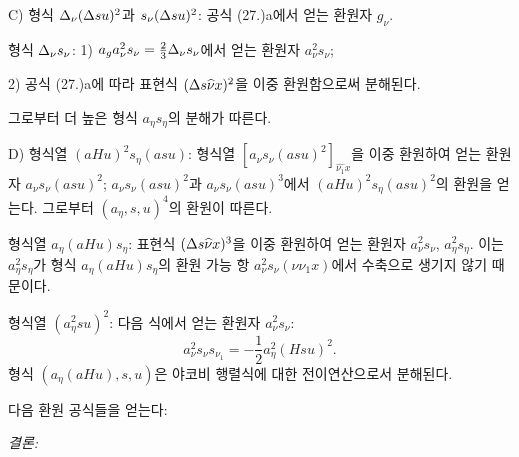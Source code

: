 C) 형식 $\Delta_\nu(\Delta su)^2$과 $s_\nu(\Delta su)^2$: 공식 (27.)a에서 얻는 환원자 $g_\nu$.

형식 $\Delta_\nu s_\nu$: 1) $a_ga_\nu^2s_\nu=\frac23\Delta_\nu s_\nu$에서 얻는 환원자 $a_\nu^2s_\nu$;

2) 공식 (27.)a에 따라 표현식 $(\Delta s\widehat{\nu}x)^2$을 이중 환원함으로써 분해된다.

그로부터 더 높은 형식 $a_\eta s_\eta$의 분해가 따른다.

D) 형식열 $(aHu)^2s_\eta(asu)$: 형식열 $[a_\nu s_\nu(asu)^2]_{\widehat{\nu_1}x}$을 이중 환원하여 얻는 환원자 $a_\nu s_\nu(asu)^2$; $a_\nu s_\nu(asu)^2$과 $a_\nu s_\nu(asu)^3$에서 $(aHu)^2s_\eta(asu)^2$의 환원을 얻는다. 그로부터 $(a_\eta,s,u)^4$의 환원이 따른다.

형식열 $a_\eta(aHu)s_\eta$: 표현식 $(\Delta s\widehat{\nu}x)^3$을 이중 환원하여 얻는 환원자 $a_\nu^2s_\nu$, $a_\eta^2s_\eta$. 이는 $a_\eta^2s_\eta$가 형식 $a_\eta(aHu)s_\eta$의 환원 가능 항 $a_\nu^2s_\nu(\nu\nu_1x)$에서 수축으로 생기지 않기 때문이다.

형식열 $(a_\eta^2su)^2$: 다음 식에서 얻는 환원자 $a_\nu^2s_\nu$:
\[
a_\nu^2s_\nu s_{\nu_1}=-\frac12a_\eta^2(Hsu)^2.
\]
형식 $(a_\eta(aHu),s,u)$은 야코비 행렬식에 대한 전이연산으로서 분해된다.

다음 환원 공식들을 얻는다:

\noindent\emph{결론:}

